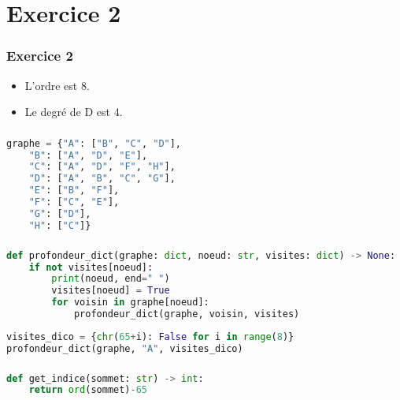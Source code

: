 \documentclass[svgnames,11pt]{beamer}
\begin{document}
\section{Exercice 2}
\begin{frame}
    \frametitle{Exercice 2}

    \begin{itemize}
        \item L'ordre est 8.
        \item Le degré de D est 4.
    \end{itemize}

\end{frame}
\begin{frame}[fragile]
    \frametitle{}

\begin{center}
\begin{lstlisting}[language=Python , basicstyle=\ttfamily\small, xleftmargin=2em, xrightmargin=2em]
graphe = {"A": ["B", "C", "D"],
    "B": ["A", "D", "E"],
    "C": ["A", "D", "F", "H"],
    "D": ["A", "B", "C", "G"],
    "E": ["B", "F"],
    "F": ["C", "E"],
    "G": ["D"],
    "H": ["C"]}
\end{lstlisting}
\end{center} 

\end{frame}
\begin{frame}[fragile]
    \frametitle{}

\begin{center}
\begin{lstlisting}[language=Python , basicstyle=\ttfamily\small, xleftmargin=0.2em, xrightmargin=0em]
def profondeur_dict(graphe: dict, noeud: str, visites: dict) -> None:
    if not visites[noeud]:
        print(noeud, end=" ")
        visites[noeud] = True
        for voisin in graphe[noeud]:
            profondeur_dict(graphe, voisin, visites)
\end{lstlisting}

\begin{lstlisting}[language=Python , basicstyle=\ttfamily\small, xleftmargin=0.2em, xrightmargin=0em]
visites_dico = {chr(65+i): False for i in range(8)}
profondeur_dict(graphe, "A", visites_dico)
\end{lstlisting}
\end{center} 

\end{frame}
\begin{frame}[fragile]
    \frametitle{}

\begin{center}
\begin{lstlisting}[language=Python , basicstyle=\ttfamily\small, xleftmargin=2em, xrightmargin=2em]
def get_indice(sommet: str) -> int:
    return ord(sommet)-65
\end{lstlisting}
\end{center} 

\end{frame}
\end{document}
